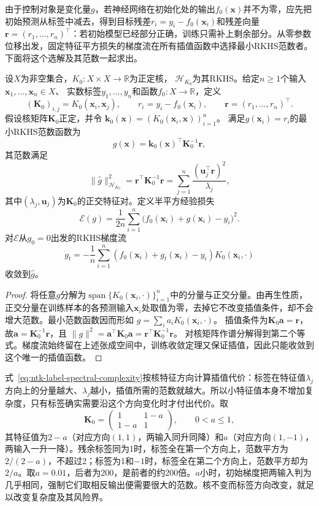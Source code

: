 由于控制对象是变化量$g$，若神经网络在初始化处的输出$f_0(\bm x)$并不为零，应先把初始预测从标签中减去，得到目标残差$r_i=y_i-f_0(\bm x_i)$和残差向量$\bm r=(r_1,\ldots,r_n)^\top$：若初始模型已经部分正确，训练只需补上剩余部分。从零参数位移出发，固定特征平方损失的梯度流在所有插值函数中选择最小RKHS范数者。下面将这个选解及其范数一起求出。

\begin{theorem}[初始梯度特征的最小范数插值]
\label{thm:ntk-minimum-rkhs-norm}
设$X$为非空集合，$K_0:X\times X\to\mathbb R$为正定核，
$\mathcal H_{K_0}$为其RKHS。给定$n\geq1$个输入$\bm x_1,\ldots,\bm x_n\in X$、
实数标签$y_1,\ldots,y_n$和函数$f_0:X\to\mathbb R$，定义
\[
 (\bm K_0)_{i,j}=K_0(\bm x_i,\bm x_j),\qquad
 r_i=y_i-f_0(\bm x_i),\qquad
 \bm r=(r_1,\ldots,r_n)^\top.
\]
假设核矩阵$\bm K_0$正定，并令
$\bm k_0(\bm x)=(K_0(\bm x_i,\bm x))_{i=1}^{n}$。
满足$g(\bm x_i)=r_i$的最小RKHS范数函数为
\[
 \widehat g(\bm x)=\bm k_0(\bm x)^\top\bm K_0^{-1}\bm r,
\]
其范数满足
\begin{equation}
 \|\widehat g\|_{\mathcal H_{K_0}}^2
 =\bm r^\top\bm K_0^{-1}\bm r
 =\sum_{j=1}^n\frac{(\bm u_j^\top\bm r)^2}{\lambda_j},
 \label{eq:ntk-label-spectral-complexity}
\end{equation}
其中$(\lambda_j,\bm u_j)$为$\bm K_0$的正交特征对。定义半平方经验损失
\[
 \mathcal E(g)=\frac1{2n}\sum_{i=1}^n
 \bigl(f_0(\bm x_i)+g(\bm x_i)-y_i\bigr)^2.
\]
对$\mathcal E$从$g_0=0$出发的RKHS梯度流
\[
 \dot g_t=-\frac1n\sum_{i=1}^n
 (f_0(\bm x_i)+g_t(\bm x_i)-y_i)K_0(\bm x_i,\cdot)
\]
收敛到$\widehat g$。
\end{theorem}
\begin{proof}
将任意$g$分解为$\operatorname{span}\{K_0(\bm x_i,\cdot)\}_{i=1}^n$中的分量与正交分量。由再生性质，正交分量在训练样本的各预测输入$\bm x_i$处取值为零，去掉它不改变插值条件，却不会增大范数。最小范数函数因而形如
$g=\sum_i a_iK_0(\bm x_i,\cdot)$。
插值条件为$\bm K_0\bm a=\bm r$，故$\bm a=\bm K_0^{-1}\bm r$，且
$\|g\|^2=\bm a^\top\bm K_0\bm a=\bm r^\top\bm K_0^{-1}\bm r$。
对核矩阵作谱分解得到第二个等式。梯度流始终留在上述张成空间中，训练收敛定理又保证插值，因此只能收敛到这个唯一的插值函数。
\end{proof}

式~\eqref{eq:ntk-label-spectral-complexity}按核特征方向计算插值代价：标签在特征值$\lambda_j$方向上的分量越大、$\lambda_j$越小，插值所需的范数就越大。所以小特征值本身不增加复杂度，只有标签确实需要沿这个方向变化时才付出代价。取
\[
 \bm K_0=\begin{pmatrix}1&1-a\\1-a&1\end{pmatrix},\qquad 0<a\leq1,
\]
其特征值为$2-a$（对应方向$(1,1)$，两输入同升同降）和$a$（对应方向$(1,-1)$，两输入一升一降）。残余标签同为1时，标签全在第一个方向上，范数平方为$2/(2-a)$，不超过2；标签为1和$-1$时，标签全在第二个方向上，范数平方却为$2/a$。取$a=0.01$，后者为200，是前者的约200倍。$a$小时，初始梯度把两输入判为几乎相同，强制它们取相反输出便需要很大的范数。核不变而标签方向改变，就足以改变复杂度及其风险界。

